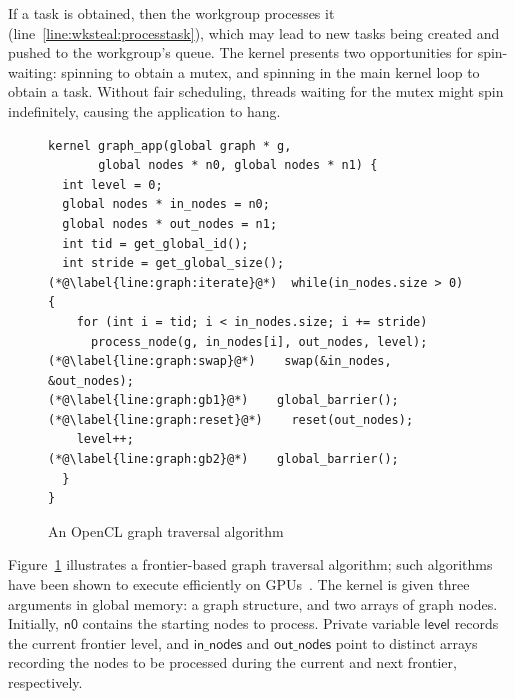 \documentclass[sigconf]{acmart}
\newcommand{\TSAdded}[1]{#1}
\newcommand{\myfiglong}{Figure~}
\newcommand{\keyword}[1]{\mathsf{#1}}
\begin{document}
If a task is obtained, then the workgroup processes it
(line~\ref{line:wksteal:processtask}), which may lead to new tasks
being created and pushed to the workgroup's queue. The kernel presents
two opportunities for spin-waiting: spinning to obtain a mutex, and
spinning in the main kernel loop to obtain a task. \TSAdded{Without fair
scheduling, threads waiting for the mutex might spin indefinitely,
causing the application to hang.}


%
%




\begin{figure}[t]

\begin{lstlisting}
kernel graph_app(global graph * g,
       global nodes * n0, global nodes * n1) {
  int level = 0;
  global nodes * in_nodes = n0;
  global nodes * out_nodes = n1;
  int tid = get_global_id();
  int stride = get_global_size();
(*@\label{line:graph:iterate}@*)  while(in_nodes.size > 0) {
    for (int i = tid; i < in_nodes.size; i += stride)
      process_node(g, in_nodes[i], out_nodes, level);
(*@\label{line:graph:swap}@*)    swap(&in_nodes, &out_nodes);
(*@\label{line:graph:gb1}@*)    global_barrier();
(*@\label{line:graph:reset}@*)    reset(out_nodes);
    level++;
(*@\label{line:graph:gb2}@*)    global_barrier();
  }
}
\end{lstlisting}
\caption{An OpenCL graph traversal algorithm}\label{fig:graphsearch}
\end{figure}

 \myfiglong\ref{fig:graphsearch} illustrates a frontier-based graph traversal algorithm; such algorithms have
been shown to execute efficiently on GPUs~\cite{BNP12,DBLP:conf/oopsla/PaiP16}.
The kernel is
given three arguments in global memory: a graph structure, and two
arrays of graph nodes. Initially, $\keyword{n0}$ contains the
starting nodes to process. Private variable $\keyword{level}$ records the current frontier level, and $\keyword{in\_nodes}$ and $\keyword{out\_nodes}$ point to
distinct arrays recording the nodes to be processed during the current and next frontier, respectively.
\end{document}
